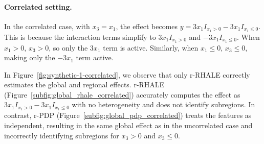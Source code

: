 \documentclass[sigconf, nonacm]{acmart}
\begin{document}
\paragraph{Correlated setting.}

In the correlated case, with \( x_3 = x_1 \), the effect becomes \( y = 3x_1I_{x_1 > 0} - 3x_1I_{x_1 \leq 0} \). This is because the interaction terms simplify to \( 3x_1I_{x_1 > 0} \) and \( -3x_1I_{x_1 \leq 0} \). When \( x_1 > 0 \), \( x_3 > 0 \), so only the \( 3x_1 \) term is active. Similarly, when \( x_1 \leq 0 \), \( x_3 \leq 0 \), making only the \( -3x_1 \) term active.

In Figure~\ref{fig:synthetic-1-correlated}, we observe that only r-RHALE correctly estimates the global and regional effects. r-RHALE (Figure~\ref{subfig:global_rhale_correlated}) accurately computes the effect as \( 3x_1I_{x_1 > 0} - 3x_1I_{x_1 \leq 0} \) with no heterogeneity and does not identify subregions. In contrast, r-PDP (Figure~\ref{subfig:global_pdp_correlated}) treats the features as independent, resulting in the same global effect as in the uncorrelated case and incorrectly identifying subregions for \( x_3 > 0 \) and \( x_3 \leq 0 \).
\end{document}
